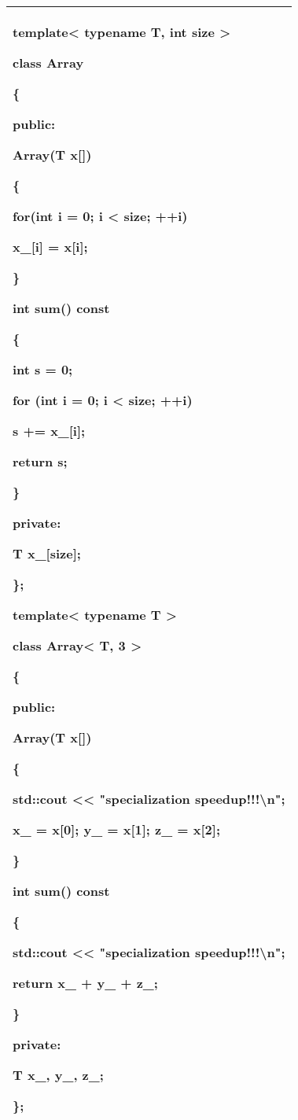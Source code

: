 \documentclass[
]{article}
\begin{document}
\begin{longtable}[]{@{}l@{}}
\toprule
\endhead
\begin{minipage}[t]{0.97\columnwidth}\raggedright
template\textless{} typename T, int size \textgreater{}

class Array

\{

public:

Array(T x{[}{]})

\{

for(int i = 0; i \textless{} size; ++i)

x\_{[}i{]} = x{[}i{]};

\}

int sum() const

\{

int s = 0;

for (int i = 0; i \textless{} size; ++i)

s += x\_{[}i{]};

return s;

\}

private:

T x\_{[}size{]};

\};

template\textless{} typename T \textgreater{}

class Array\textless{} T, 3 \textgreater{}

\{

public:

Array(T x{[}{]})

\{

std::cout \textless\textless{} "specialization
speedup!!!\textbackslash n";

x\_ = x{[}0{]}; y\_ = x{[}1{]}; z\_ = x{[}2{]};

\}

int sum() const

\{

std::cout \textless\textless{} "specialization
speedup!!!\textbackslash n";

return x\_ + y\_ + z\_;

\}

private:

T x\_, y\_, z\_;

\};\strut
\end{minipage}\tabularnewline
\bottomrule
\end{longtable}
\end{document}
